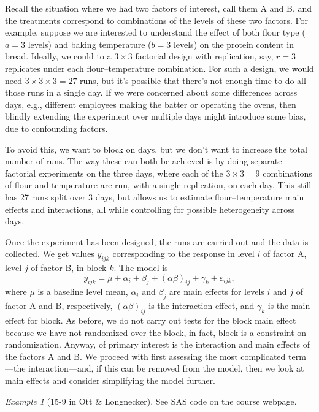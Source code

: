 \documentclass[a4paper, 12pt]{article}
\theoremstyle{plain}
\theoremstyle{definition}
\theoremstyle{remark}
\newtheorem*{example}{Example}
\newcommand{\eps}{\varepsilon}
\begin{document}
Recall the situation where we had two factors of interest, call them A and B, and the treatments correspond to combinations of the levels of these two factors.  For example, suppose we are interested to understand the effect of both flour type ($a=3$ levels) and baking temperature ($b=3$ levels) on the protein content in bread.  Ideally, we could to a $3 \times 3$ factorial design with replication, say, $r=3$ replicates under each flour--temperature combination.  For such a design, we would need $3 \times 3 \times 3 = 27$ runs, but it's possible that there's not enough time to do all those runs in a single day.  If we were concerned about some differences across days, e.g., different employees making the batter or operating the ovens, then blindly extending the experiment over multiple days might introduce some bias, due to confounding factors.  

To avoid this, we want to block on days, but we don't want to increase the total number of runs.  The way these can both be achieved is by doing separate factorial experiments on the three days, where each of the $3 \times 3 = 9$ combinations of flour and temperature are run, with a single replication, on each day.  This still has 27 runs split over 3 days, but allows us to estimate flour--temperature main effects and interactions, all while controlling for possible heterogeneity across days.  

Once the experiment has been designed, the runs are carried out and the data is collected.  We get values $y_{ijk}$ corresponding to the response in level $i$ of factor A, level $j$ of factor B, in block $k$.  The model is 
\[ y_{ijk} = \mu + \alpha_i + \beta_j + (\alpha\beta)_{ij} + \gamma_k + \eps_{ijk}, \]
where $\mu$ is a baseline level mean, $\alpha_i$ and $\beta_j$ are main effects for levels $i$ and $j$ of factor A and B, respectively, $(\alpha\beta)_{ij}$ is the interaction effect, and $\gamma_k$ is the main effect for block.  As before, we do not carry out tests for the block main effect because we have not randomized over the block, in fact, block is a constraint on randomization.  Anyway, of primary interest is the interaction and main effects of the factors A and B.  We proceed with first assessing the most complicated term---the interaction---and, if this can be removed from the model, then we look at main effects and consider simplifying the model further.  

\begin{example}[15-9 in Ott \& Longnecker]
See SAS code on the course webpage.
\end{example}
\end{document}
